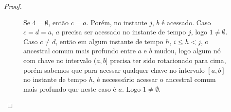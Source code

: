 \begin{proof}
\begin{figure}[H]
\begin{minipage}[t]{0.6\textwidth}
        Se $4 = \emptyset$, então $c = a$. Porém, no instante $j$, $b$ é acessado. Caso $c = d = a$, $a$ precisa ser acessado no instante de tempo $j$, logo $1 \neq \emptyset$. Caso $c \neq d$, então em algum instante de tempo $h$, $i \leq h < j$, o ancestral comum mais profundo entre $a$ e $b$ mudou, logo algum nó com chave no intervalo $(a,b]$ precisa ter sido rotacionado para cima, porém sabemos que para acessar qualquer chave no intervalo $[a,b]$ no instante de tempo $h$, é necesssário acessar o ancestral comum mais profundo que neste caso é $a$. Logo $1 \neq \emptyset$. 
    \end{minipage}\hfill
    \begin{minipage}[t]{0.4\textwidth}
        \centering
        \begin{figure}[H]
            \centering
            \begin{adjustbox}{valign=t, raise=-25pt} %
\end{adjustbox}
\end{figure}
\end{minipage}
\end{figure}
\end{proof}
